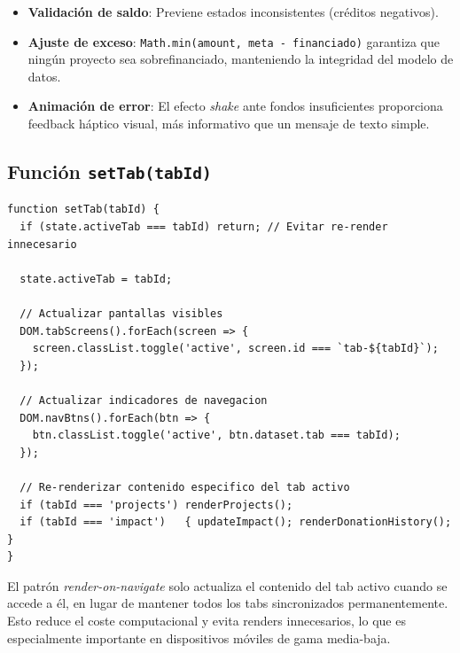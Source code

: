 \documentclass[12pt, a4paper]{article}
\begin{document}
\begin{justificacionbox}
\begin{itemize}
  \item \textbf{Validación de saldo}: Previene estados inconsistentes (créditos negativos).
  \item \textbf{Ajuste de exceso}: \texttt{Math.min(amount, meta - financiado)} garantiza que ningún proyecto sea sobrefinanciado, manteniendo la integridad del modelo de datos.
  \item \textbf{Animación de error}: El efecto \textit{shake} ante fondos insuficientes proporciona feedback háptico visual, más informativo que un mensaje de texto simple.
\end{itemize}
\end{justificacionbox}

\subsection{Función \texttt{setTab(tabId)}}

\begin{lstlisting}[style=javascript, caption={Navegación entre pestañas}]
function setTab(tabId) {
  if (state.activeTab === tabId) return; // Evitar re-render innecesario

  state.activeTab = tabId;

  // Actualizar pantallas visibles
  DOM.tabScreens().forEach(screen => {
    screen.classList.toggle('active', screen.id === `tab-${tabId}`);
  });

  // Actualizar indicadores de navegacion
  DOM.navBtns().forEach(btn => {
    btn.classList.toggle('active', btn.dataset.tab === tabId);
  });

  // Re-renderizar contenido especifico del tab activo
  if (tabId === 'projects') renderProjects();
  if (tabId === 'impact')   { updateImpact(); renderDonationHistory(); }
}
\end{lstlisting}

\begin{justificacionbox}
El patrón \textit{render-on-navigate} solo actualiza el contenido del tab activo cuando se accede a él, en lugar de mantener todos los tabs sincronizados permanentemente. Esto reduce el coste computacional y evita renders innecesarios, lo que es especialmente importante en dispositivos móviles de gama media-baja.
\end{justificacionbox}
\end{document}
